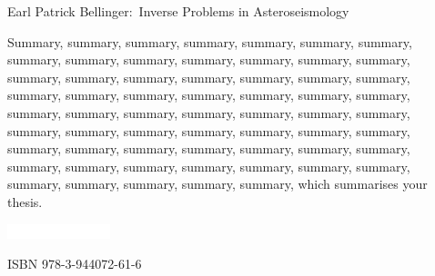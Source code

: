 \documentclass{article}
\begin{document}
\newpage

\null\vspace{-5cm}

\hspace*{-1.2cm}\colorbox{bcol}{\parbox[b][22cm][c]{15.2cm}{\null\hfill}}

\vspace{-19.4cm}


\hspace*{7mm}\begin{minipage}[t][17.5cm]{12cm}

\fontsize{12}{15}\selectfont

\textcolor{tcol}{Earl Patrick Bellinger:~Inverse Problems in Asteroseismology}%

\vspace{0.5cm}

\fontsize{12}{15}\selectfont

\textcolor{scol}{Summary, summary, summary, summary, summary, summary, summary, summary, summary, summary, summary, summary, summary, summary, summary, summary, summary, summary, summary, summary, summary, summary, summary, summary, summary, summary, summary, summary, summary, summary, summary, summary, summary, summary, summary, summary, summary, summary, summary, summary, summary, summary, summary, summary, summary, summary, summary, summary, summary, summary, summary, summary, summary, summary, summary, summary, summary, summary, summary, summary, summary, which summarises your thesis. }%

\vfill

\parbox[b]{30mm}{\includegraphics[width=30mm]{uni-edition-white.pdf}}\hfill\textcolor{scol}{ISBN 978-3-944072-61-6}%

\end{minipage}

\newpage
\null\vspace{-5cm}

\hspace*{-1.2cm}\colorbox{bcol}{\parbox[b][22cm][c]{15.2cm}{\null\hfill}}

\fontsize{12}{15}\selectfont%

\vspace{-19cm}%
\hspace*{6cm}%
\end{document}
